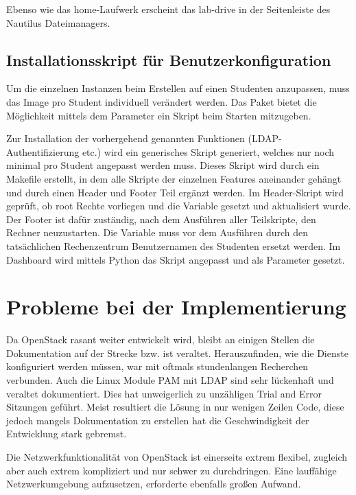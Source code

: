 Ebenso wie das home-Laufwerk erscheint das lab-drive in der Seitenleiste des Nautilus Dateimanagers.

\subsection{Installationsskript  für Benutzerkonfiguration}

Um die einzelnen Instanzen beim Erstellen auf einen Studenten anzupassen, muss das Image pro Student individuell verändert werden. 
Das  Paket bietet die Möglichkeit mittels dem Parameter  ein Skript beim Starten mitzugeben. 

Zur Installation der vorhergehend genannten Funktionen (LDAP-Authentifizierung etc.) wird ein generisches Skript generiert, welches nur noch minimal pro Student angepasst werden muss.
Dieses Skript  wird durch ein Makefile erstellt, in dem alle  Skripte der einzelnen Features aneinander gehängt und durch einen Header und Footer Teil ergänzt werden.
Im Header-Skript wird geprüft, ob root Rechte vorliegen und die  Variable gesetzt und  aktualisiert wurde. 
Der Footer ist dafür zuständig, nach dem Ausführen aller Teilskripte, den Rechner neuzustarten.
Die  Variable muss vor dem Ausführen durch den tatsächlichen Rechenzentrum Benutzernamen des Studenten ersetzt werden.
Im Dashboard wird mittels Python das Skript angepasst und als  Parameter gesetzt.

\section{Probleme bei der Implementierung}

Da OpenStack rasant weiter entwickelt wird, bleibt an einigen Stellen die Dokumentation auf der Strecke bzw. ist veraltet. 
Herauszufinden, wie die Dienste konfiguriert werden müssen, war mit oftmals stundenlangen Recherchen verbunden.
Auch die Linux Module PAM mit LDAP sind sehr lückenhaft und veraltet dokumentiert.
Dies hat unweigerlich zu unzähligen Trial and Error Sitzungen geführt.
Meist resultiert die Lösung in nur wenigen Zeilen Code, diese jedoch mangels Dokumentation zu erstellen hat die Geschwindigkeit der Entwicklung stark gebremst.

Die Netzwerkfunktionalität von OpenStack ist einerseits extrem flexibel, zugleich aber auch extrem kompliziert und nur schwer zu durchdringen.
Eine lauffähige Netzwerkumgebung aufzusetzen, erforderte ebenfalls großen Aufwand.

